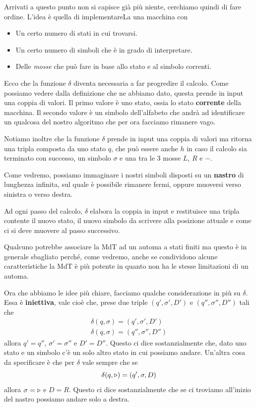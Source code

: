 Arrivati a questo punto non si capisce già più niente,
cerchiamo quindi di fare ordine. L'idea è quella di
implementareLa una macchina con
\begin{itemize}
	\item Un certo numero di stati in cui trovarsi.
	\item Un certo numero di simboli che è in grado di
	      interpretare.
	\item Delle \emph{mosse} che può fare in base allo
	      stato e al simbolo correnti.
\end{itemize}
Ecco che la funzione $\delta$ diventa necessaria a far
progredire il calcolo. Come possiamo vedere dalla definizione
che ne abbiamo dato, questa prende in input una coppia di
valori. Il primo valore è uno stato, ossia lo stato
\textbf{corrente} della macchina. Il secondo valore è un
simbolo dell'alfabeto che andrà ad identificare un qualcosa
del nostro algoritmo che per ora facciamo rimanere vago.

Notiamo inoltre che la funzione $\delta$ prende in input una
coppia di valori ma ritorna una tripla composta da uno stato
$q$, che può essere anche $h$ in caso il calcolo sia terminato
con successo, un simbolo $\sigma$ e una tra le 3 mosse $L$,
$R$ e $-$.

Come vedremo, possiamo immaginare i nostri simboli disposti
su un \textbf{nastro} di lunghezza infinita, sul quale è
possibile rimanere fermi, oppure muoversi verso sinistra o
verso destra.

Ad ogni passo del calcolo, $\delta$ elabora la coppia in input
e restituisce una tripla contente il nuovo stato, il nuovo
simbolo da scrivere alla posizione attuale e come ci si deve
muovere al passo successivo.

Qualcuno potrebbe associare la MdT ad un automa a stati finiti
ma questo è in generale sbagliato perché, come vedremo, anche
se condividono alcune caratteristiche la MdT è più potente in
quanto non ha le stesse limitazioni di un automa.

Ora che abbiamo le idee più chiare, facciamo qualche
considerazione in più su $\delta$. Essa è \textbf{iniettiva},
vale cioè che, prese due triple $(q', \sigma', D')$ e
$(q'', \sigma'', D'')$ tali che
\begin{gather*}
	\delta (q, \sigma) =  (q', \sigma', D') \\
	\delta (q, \sigma) = (q'', \sigma'', D'')
\end{gather*}
allora $q' = q''$, $\sigma' = \sigma''$ e $D' = D''$.
Questo ci dice sostanzialmente che, dato uno stato e un simbolo
c'è un solo altro stato in cui possiamo andare. Un'altra cosa
da specificare è che per $\delta$ vale sempre che se
\[ \delta(q, \triangleright) = (q', \sigma, D) \]
allora $\sigma = \triangleright$ e $D = R$. Questo ci dice
sostanzialmente che se ci troviamo all'inizio del nastro
possiamo andare solo a destra.

